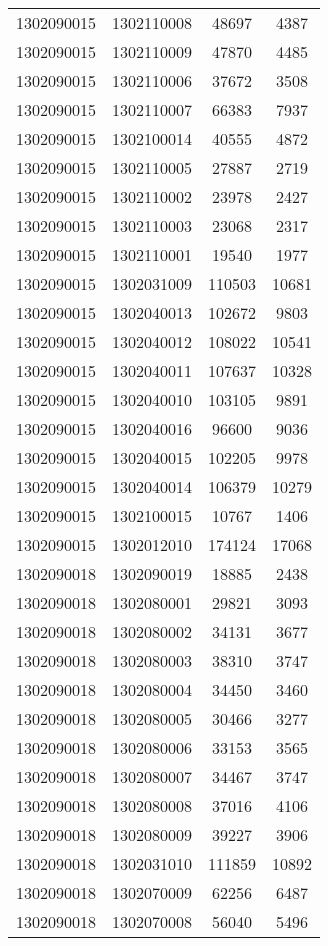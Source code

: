 \begin{longtable}[h]{llcc}
		1302090015 & 1302110008 & 48697 & 4387\\
		1302090015 & 1302110009 & 47870 & 4485\\
		1302090015 & 1302110006 & 37672 & 3508\\
		1302090015 & 1302110007 & 66383 & 7937\\
		1302090015 & 1302100014 & 40555 & 4872\\
		1302090015 & 1302110005 & 27887 & 2719\\
		1302090015 & 1302110002 & 23978 & 2427\\
		1302090015 & 1302110003 & 23068 & 2317\\
		1302090015 & 1302110001 & 19540 & 1977\\
		1302090015 & 1302031009 & 110503 & 10681\\
		1302090015 & 1302040013 & 102672 & 9803\\
		1302090015 & 1302040012 & 108022 & 10541\\
		1302090015 & 1302040011 & 107637 & 10328\\
		1302090015 & 1302040010 & 103105 & 9891\\
		1302090015 & 1302040016 & 96600 & 9036\\
		1302090015 & 1302040015 & 102205 & 9978\\
		1302090015 & 1302040014 & 106379 & 10279\\
		1302090015 & 1302100015 & 10767 & 1406\\
		1302090015 & 1302012010 & 174124 & 17068\\
		1302090018 & 1302090019 & 18885 & 2438\\
		1302090018 & 1302080001 & 29821 & 3093\\
		1302090018 & 1302080002 & 34131 & 3677\\
		1302090018 & 1302080003 & 38310 & 3747\\
		1302090018 & 1302080004 & 34450 & 3460\\
		1302090018 & 1302080005 & 30466 & 3277\\
		1302090018 & 1302080006 & 33153 & 3565\\
		1302090018 & 1302080007 & 34467 & 3747\\
		1302090018 & 1302080008 & 37016 & 4106\\
		1302090018 & 1302080009 & 39227 & 3906\\
		1302090018 & 1302031010 & 111859 & 10892\\
		1302090018 & 1302070009 & 62256 & 6487\\
		1302090018 & 1302070008 & 56040 & 5496\\

\end{longtable}
